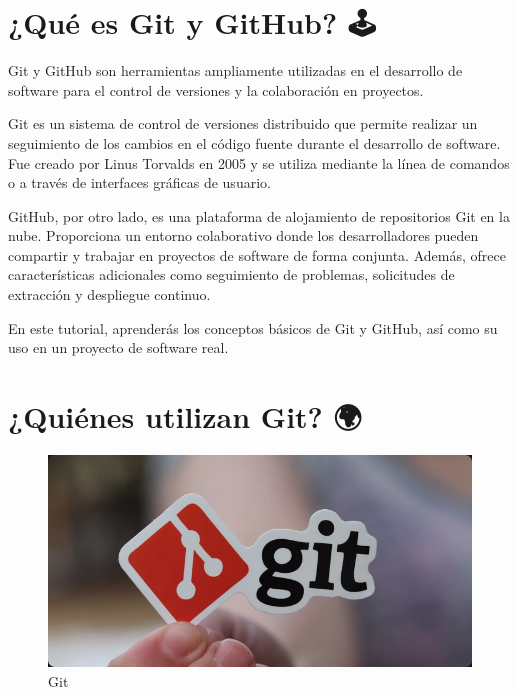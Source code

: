 \documentclass[
  a4paper,
  DIV=11,
  numbers=noendperiod,
  onepage,
  openany]{scrreprt}
\begin{document}
\section{¿Qué es Git y GitHub? 🕹️}\label{quuxe9-es-git-y-github}

Git y GitHub son herramientas ampliamente utilizadas en el desarrollo de
software para el control de versiones y la colaboración en proyectos.

Git es un sistema de control de versiones distribuido que permite
realizar un seguimiento de los cambios en el código fuente durante el
desarrollo de software. Fue creado por Linus Torvalds en 2005 y se
utiliza mediante la línea de comandos o a través de interfaces gráficas
de usuario.

GitHub, por otro lado, es una plataforma de alojamiento de repositorios
Git en la nube. Proporciona un entorno colaborativo donde los
desarrolladores pueden compartir y trabajar en proyectos de software de
forma conjunta. Además, ofrece características adicionales como
seguimiento de problemas, solicitudes de extracción y despliegue
continuo.

En este tutorial, aprenderás los conceptos básicos de Git y GitHub, así
como su uso en un proyecto de software real.

\section{¿Quiénes utilizan Git? 🌍}\label{quiuxe9nes-utilizan-git}

\begin{figure}[H]

{\centering \includegraphics[width=6.25in,height=\textheight]{unidades/unidad1/../../images/git-logo-sticker.png}

}

\caption{Git}

\end{figure}%
\end{document}
